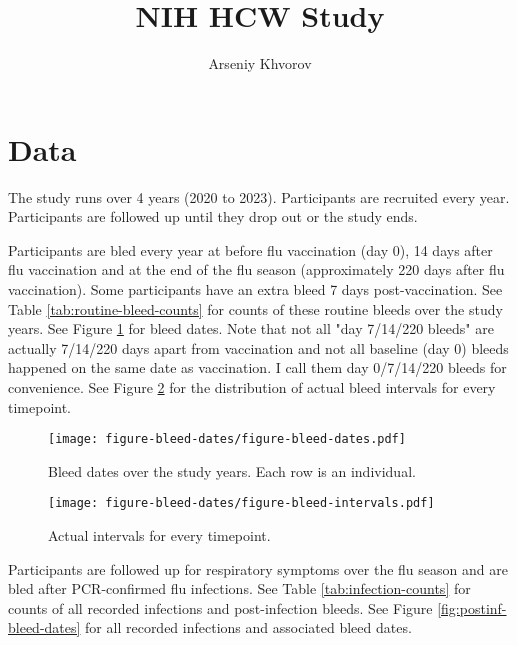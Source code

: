 \documentclass[12pt]{article}
\title{NIH HCW Study}
\author{Arseniy Khvorov}
\begin{document}
\maketitle

\section{Data}

The study runs over 4 years (2020 to 2023). 
Participants are recruited every year.
Participants are followed up until they drop out or the study ends.

Participants are bled every year at before flu vaccination (day 0), 14 days after flu vaccination and at the end of the flu season (approximately 220 days after flu vaccination). 
Some participants have an extra bleed 7 days post-vaccination.
See Table \ref{tab:routine-bleed-counts} for counts of these routine bleeds over the study years. 
See Figure \ref{fig:bleed-dates} for bleed dates.
Note that not all "day 7/14/220 bleeds" are actually 7/14/220 days apart from vaccination and not all baseline (day 0) bleeds happened on the same date as vaccination.
I call them day 0/7/14/220 bleeds for convenience.
See Figure \ref{fig:bleed-intervals} for the distribution of actual bleed intervals for every timepoint.



\begin{figure}
	\texttt{[image: figure-bleed-dates/figure-bleed-dates.pdf]}
	\caption{Bleed dates over the study years. Each row is an individual.}
	\label{fig:bleed-dates}
\end{figure}

\begin{figure}
	\texttt{[image: figure-bleed-dates/figure-bleed-intervals.pdf]}
	\caption{Actual intervals for every timepoint.}
	\label{fig:bleed-intervals}
\end{figure}

Participants are followed up for respiratory symptoms over the flu season and are bled after PCR-confirmed flu infections.
See Table \ref{tab:infection-counts} for counts of all recorded infections and post-infection bleeds.
See Figure \ref{fig:postinf-bleed-dates} for all recorded infections and associated bleed dates.


\end{document}
